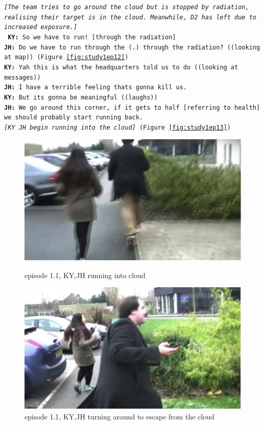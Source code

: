 \noindent\texttt{\emph{[The team tries to go around the cloud but is stopped by radiation, realising their target is in the cloud. Meanwhile, D2 has left due to increased exposure.]\\}
\textbf{KY:} So we have to run! [through the radiation] \\
\textbf{JH:} Do we have to run through the (.) through the radiation? ((looking at map)) (Figure \ref{fig:study1ep12})\\
\textbf{KY:} Yah this is what the headquarters told us to do ((looking at messages)) \\
\textbf{JH:} I have a terrible feeling thats gonna kill us.\\
\textbf{KY:} But its gonna be meaningful ((laughs))\\
\textbf{JH:} We go around this corner, if it gets to half [referring to health] we should probably start running back.\\
\emph{ [KY JH begin running into the cloud] } (Figure \ref{fig:study1ep13})
}

\begin{figure}[ht]
\centering
\begin{minipage}[b]{0.45\linewidth}
\includegraphics[width=1\textwidth]{img/study1/ep1/ep13}
\caption{episode 1.1, KY,JH running into cloud}
\label{fig:study1ep13}
\end{minipage}
\quad
\begin{minipage}[b]{0.45\linewidth}
 \includegraphics[width=1\textwidth]{img/study1/ep1/ep14}
\caption{episode 1.1, KY,JH turning around to escape from the cloud}
\label{fig:study1ep1-4}
\end{minipage}
\end{figure}

